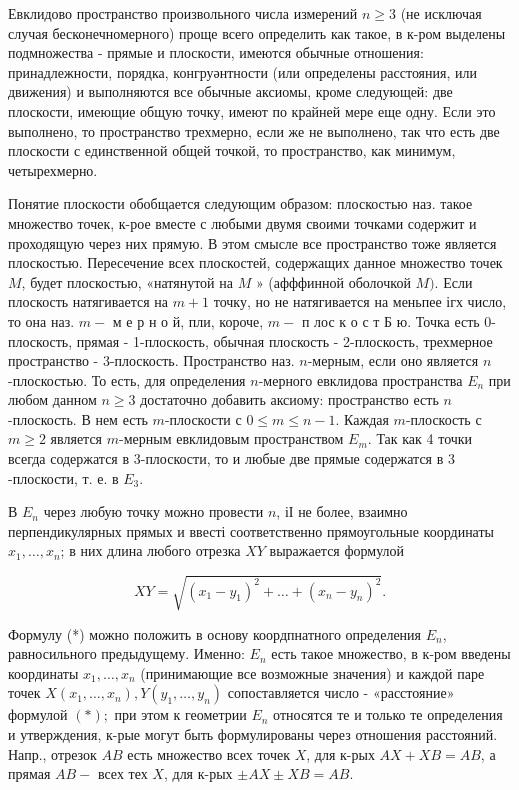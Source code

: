 \documentclass[10pt]{article}
\begin{document}
Евклидово пространство произвольного числа измерений $n \geqslant 3$ (не исключая случая бесконечномерного) проще всего определить как такое, в к-ром выделены подмножества - прямые и плоскости, имеются обычные отношения: принадлежности, порядка, конгруәнтности (или определены расстояния, или движения) и выполняются все обычные аксиомы, кроме следующей: две плоскости, имеющие общую точку, имеют по крайней мере еще одну. Если это выполнено, то пространство трехмерно, если же не выполнено, так что есть две плоскости с единственной общей точкой, то пространство, как минимум, четырехмерно.



Понятие плоскости обобщается следующим образом: плоскостью наз. такое множество точек, к-рое вместе с любыми двумя своими точками содержит и проходящую через них прямую. В этом смысле все пространство тоже является плоскостью. Пересечение всех плоскостей, содержащих данное множество точек $M$, будет плоскостью, «натянутой на $M$ » (афффинной оболочкой $M)$. Если плоскость натягивается на $m+1$ точку, но не натягивается на меньпее ігх число, то она наз. $m-$ м е р н о й, пли, короче, $m-$ п лос к о с т Б ю. Точка есть 0-плоскость, прямая - 1-плоскость, обычная плоскость - 2-плоскость, трехмерное пространство - 3-плоскость. Пространство наз. $n$-мерным, если оно является $n$-плоскостью. То есть, для определения $n$-мерного евклидова пространства $E_{n}$ при любом данном $n \geqslant 3$ достаточно добавить аксиому: пространство есть $n$-плоскость. В нем есть $m$-плоскости с $0 \leqslant m \leqslant n-1$. Каждая $m$-плоскость с $m \geqslant 2$ является $m$-мерным евклидовым пространством $E_{m}$. Так как 4 точки всегда содержатся в 3-плоскости, то и любые две прямые содержатся в 3 -плоскости, т. е. в $E_{3}$.



В $E_{n}$ через любую точку можно провести $n$, іІ не более, взаимно перпендикулярных прямых и ввесті соответственно прямоугольные координаты $x_{1}, \ldots, x_{n}$; в них длина любого отрезка $X Y$ выражается формулой



\[

X Y=\sqrt{\left(x_{1}-y_{1}\right)^{2}+\ldots+\left(x_{n}-y_{n}\right)^{2}} .

\]



Формулу (*) можно положить в основу коордпнатного определения $E_{n}$, равносильного предыдущему. Именно: $E_{n}$ есть такое множество, в к-ром введены координаты $x_{1}, \ldots, x_{n}$ (принимающие все возможные значения) и каждой паре точек $X\left(x_{1}, \ldots, x_{n}\right), Y\left(y_{1}, \ldots, y_{n}\right)$ сопоставляется число - «расстояние» формулой $(*) ;$ при этом к геометрии $E_{n}$ относятся те и только те определения и утверждения, к-рые могут быть формулированы через отношения расстояний. Напр., отрезок $A B$ есть множество всех точек $X$, для к-рых $A X+X B=A B$, а прямая $A B-$ всех тех $X$, для к-рых $\pm A X \pm X B=A B$.
\end{document}
